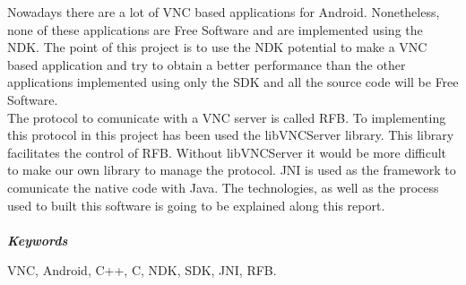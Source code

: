 
Nowadays there are a lot of VNC based applications for Android. Nonetheless, none of these applications are Free Software and are implemented using the NDK. The point of this project is to use the NDK potential to make a VNC based application and try to obtain a better performance than the other applications implemented using only the SDK and all the source code will be Free Software.\\

The protocol to comunicate with a VNC server is called RFB. To implementing this protocol in this project has been used the libVNCServer library. This library facilitates the control of RFB. Without libVNCServer it would be more difficult to make our own library to manage the protocol. JNI is used as the framework to comunicate the native code with Java. The technologies, as well as the process used to built this software is going to be explained along this report. 
\\ \mbox{ } \\
\textit{\textbf{Keywords}}

VNC, Android, C++, C, NDK, SDK, JNI, RFB.
